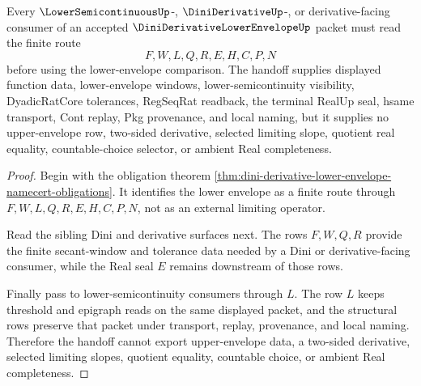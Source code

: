 \begin{theorem}
\label{thm:dini-derivative-lower-envelope-handoff}
Every $\LowerSemicontinuousUp$-, $\DiniDerivativeUp$-, or derivative-facing consumer of an accepted $\DiniDerivativeLowerEnvelopeUp$ packet must read the finite route
$$
F,W,L,Q,R,E,H,C,P,N
$$
before using the lower-envelope comparison. The handoff supplies displayed function data, lower-envelope windows, lower-semicontinuity visibility, DyadicRatCore tolerances, RegSeqRat readback, the terminal RealUp seal, hsame transport, Cont replay, Pkg provenance, and local naming, but it supplies no upper-envelope row, two-sided derivative, selected limiting slope, quotient real equality, countable-choice selector, or ambient Real completeness.
\end{theorem}
\begin{proof}
Begin with the obligation theorem \autoref{thm:dini-derivative-lower-envelope-namecert-obligations}. It identifies the lower envelope as a finite route through $F,W,L,Q,R,E,H,C,P,N$, not as an external limiting operator.

Read the sibling Dini and derivative surfaces next. The rows $F,W,Q,R$ provide the finite secant-window and tolerance data needed by a Dini or derivative-facing consumer, while the Real seal $E$ remains downstream of those rows.

Finally pass to lower-semicontinuity consumers through $L$. The row $L$ keeps threshold and epigraph reads on the same displayed packet, and the structural rows preserve that packet under transport, replay, provenance, and local naming. Therefore the handoff cannot export upper-envelope data, a two-sided derivative, selected limiting slopes, quotient equality, countable choice, or ambient Real completeness.
\end{proof}



